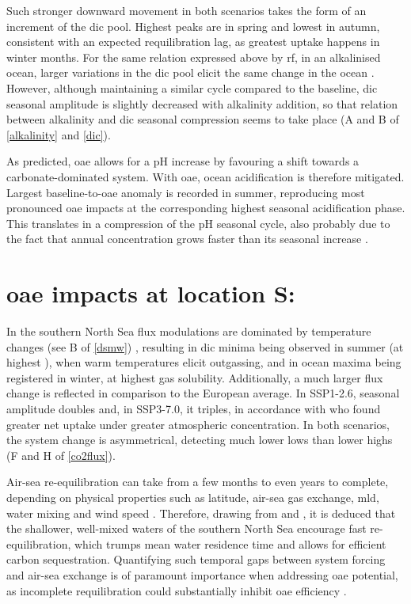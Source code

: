 Such stronger  downward movement in both scenarios takes the form of an increment of the \ac{dic} pool. Highest peaks are in spring and lowest in autumn, consistent with an expected requilibration lag, as greatest uptake happens in winter months. For the same relation expressed above by \ac{rf}, in an alkalinised ocean, larger variations in the \ac{dic} pool elicit the same change in the ocean . However, although maintaining a similar cycle compared to the baseline, \ac{dic} seasonal amplitude is slightly decreased with alkalinity addition, so that relation between alkalinity and \ac{dic} seasonal compression seems to take place (A and B of \cref{alkalinity} and \cref{dic}).  

As predicted, \ac{oae} allows for a pH increase by favouring a shift towards a carbonate-dominated system. With \ac{oae}, ocean acidification is therefore mitigated. Largest baseline-to-\ac{oae} anomaly is recorded in summer, reproducing most pronounced \ac{oae} impacts at the corresponding highest seasonal acidification phase. This translates in a compression of the pH seasonal cycle, also probably due to the fact that  annual concentration grows faster than its seasonal increase \citep{kwiatkowski2022modified, kwiatkowski2018diverging}.

\section[\texorpdfstring{OAE}{OAE} impacts at location S:]{\ac{oae} impacts at location S:}

In the southern North Sea  flux modulations are dominated by temperature changes (see B of \cref{dsmw}) \citep{rodgers2023seasonal, salt2013variability, prowe2009mechanisms}, resulting in \ac{dic} minima being observed in summer (at highest ), when warm temperatures elicit outgassing, and in ocean  maxima being registered in winter, at highest gas solubility. Additionally, a much larger flux change is reflected in comparison to the European average. In SSP1-2.6,  seasonal amplitude doubles and, in SSP3-7.0, it triples, in accordance with \cite{lenton2018assessing} who found greater net uptake under greater atmospheric  concentration. In both scenarios, the system change is asymmetrical, detecting much lower lows than lower highs (F and H of \cref{co2flux}). 

Air-sea re-equilibration can take from a few months to even years to complete, depending on physical properties such as latitude, air-sea gas exchange, \ac{mld}, water mixing and wind speed \citep{jones2014spatial}. Therefore, drawing from \cite{wang2023simulated} and \cite{jones2014spatial}, it is deduced that the shallower, well-mixed waters of the southern North Sea encourage fast re-equilibration, which trumps mean water residence time and allows for efficient carbon sequestration. Quantifying such temporal gaps between system forcing and air-sea exchange is of paramount importance when addressing \ac{oae} potential, as incomplete requilibration could substantially inhibit \ac{oae} efficiency \citep{wang2023simulated, jones2014spatial}. 

